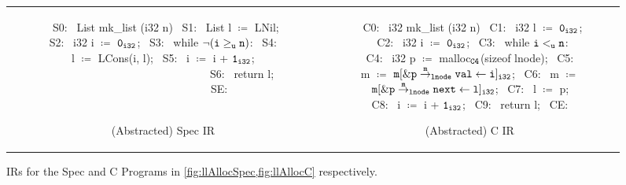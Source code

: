 \begin{figure}[H]
\begin{tabular}{cc}
\begin{subfigure}[b]{0.4\textwidth}
\begin{center}
\begin{allLangEnvFoot}
~{\scriptsize \textcolor{mygray}{S0:}}~ List mk_list (i32 n) {
~{\scriptsize \textcolor{mygray}{S1:}}~   List l $\coloneqq$ LNil;
~{\scriptsize \textcolor{mygray}{S2:}}~   i32  i $\coloneqq$ ${\tt 0_{i32}}$;
~{\scriptsize \textcolor{mygray}{S3:}}~   while $\mathrm{\tt \neg (i \geq_{u} n)}$:
~{\scriptsize \textcolor{mygray}{S4:}}~     l $\coloneqq$ LCons(i, l);
~{\scriptsize \textcolor{mygray}{S5:}}~     i $\coloneqq$ i + ${\tt 1_{i32}}$; $\phantom{m \coloneqq \mathrm{\tt m[\&\structPointer{\tt p}{m}{lnode}{val} \leftarrow i]_{i32}};}$
~{\scriptsize \textcolor{mygray}{S6:}}~   return l; $\phantom{m \coloneqq \mathrm{\tt m[\&\structPointer{\tt p}{m}{lnode}{next} \leftarrow l]_{i32}};}$
~{\scriptsize \textcolor{mygray}{SE:}}~ }
~{\scriptsize \textcolor{mygray}{   }}~
~{\scriptsize \textcolor{mygray}{   }}~
~{\scriptsize \textcolor{mygray}{   }}~
\end{allLangEnvFoot}
\end{center}
\vspace{-15px}
\caption{\label{fig:llAllocSpecIR}(Abstracted) Spec IR}
\end{subfigure}%
&
\begin{subfigure}[b]{0.6\textwidth}
\begin{center}
\begin{allLangEnvFoot}
~{\scriptsize \textcolor{mygray}{C0:}}~ i32 mk_list (i32 n) {
~{\scriptsize \textcolor{mygray}{C1:}}~   i32 l $\coloneqq$ ${\tt 0_{i32}}$;
~{\scriptsize \textcolor{mygray}{C2:}}~   i32 i $\coloneqq$ ${\tt 0_{i32}}$;
~{\scriptsize \textcolor{mygray}{C3:}}~   while ${\tt i <_{u} n}$:
~{\scriptsize \textcolor{mygray}{C4:}}~     i32 p $\coloneqq$ malloc$_{\tt C4}$(sizeof lnode);
~{\scriptsize \textcolor{mygray}{C5:}}~     m $\coloneqq$ $\mathrm{\tt m[\&{\tt p} \overset{m}{\rightarrow}_{{\tt lnode}} {\tt val} \leftarrow i]_{i32}}$;
~{\scriptsize \textcolor{mygray}{C6:}}~     m $\coloneqq$ $\mathrm{\tt m[\&{\tt p} \overset{m}{\rightarrow}_{{\tt lnode}} {\tt next} \leftarrow l]_{i32}}$;
~{\scriptsize \textcolor{mygray}{C7:}}~     l $\coloneqq$ p;
~{\scriptsize \textcolor{mygray}{C8:}}~     i $\coloneqq$ i + ${\tt 1_{i32}}$;
~{\scriptsize \textcolor{mygray}{C9:}}~   return l;
~{\scriptsize \textcolor{mygray}{CE:}}~ }
\end{allLangEnvFoot}
\end{center}
\vspace{-15px}
\caption{\label{fig:llAllocCIR}(Abstracted) C IR}
\end{subfigure}%
\\
\end{tabular}
\caption{\label{fig:llAllocSpecIRAndCIR}IRs for the Spec and C Programs in \cref{fig:llAllocSpec,fig:llAllocC} respectively.}
\end{figure}
